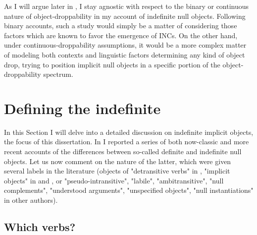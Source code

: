 As I will argue later in , I stay agnostic with respect to the binary or continuous nature of object-droppability in my account of indefinite null objects. Following binary accounts, such a study would simply be a matter of considering those factors which are known to favor the emergence of INCs. On the other hand, under continuous-droppability assumptions, it would be a more complex matter of modeling both contexts and linguistic factors determining any kind of object drop, trying to position implicit null objects in a specific portion of the object-droppability spectrum.


\section{Defining the indefinite} 

In this Section I will delve into a detailed discussion on indefinite implicit objects, the focus of this dissertation. In  I reported a series of both now-classic and more recent accounts of the differences between so-called definite and indefinite null objects. Let us now comment on the nature of the latter, which were given several labels in the literature (objects of "detransitive verbs" in \textcite[46]{Yasutake1987}, "implicit objects" in \textcite{Glass2013} and \textcite[29]{PethoKardos2006}, or "pseudo-intransitive", "labile", "ambitransitive", "null complements", "understood arguments", "unspecified objects", "null instantiations" in other authors).


\subsection{Which verbs?} 

